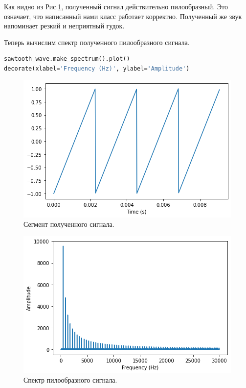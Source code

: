 \documentclass[a4paper, 14pt]{extarticle}
\begin{document}
    Как видно из Рис.\ref{fig:task2_segment_signal}, полученный сигнал действительно пилообразный.
    Это означает, что написанный нами класс работает корректно. Полученный же звук напоминает резкий и неприятный гудок.

    Теперь вычислим спектр полученного пилообразного сигнала.

    \begin{lstlisting}[language=Python, caption= Вычисление и вывод спектра пилообразного сигнала., label={lst:task2_spectrum_sawtooth}]
sawtooth_wave.make_spectrum().plot()
decorate(xlabel='Frequency (Hz)', ylabel='Amplitude')
    \end{lstlisting}

    \begin{figure}[H]
        \centering
        \includegraphics[width=0.8\linewidth]{resources/Images/task2_segment_signal}
        \caption{Сегмент полученного сигнала.}
        \label{fig:task2_segment_signal}
    \end{figure}

    \begin{figure}[H]
        \centering
        \includegraphics[width=0.8\linewidth]{resources/Images/task2_spectrum_sawtooth}
        \caption{Спектр пилообразного сигнала.}
        \label{fig:task2_spectrum_sawtooth}
    \end{figure}
\end{document}
